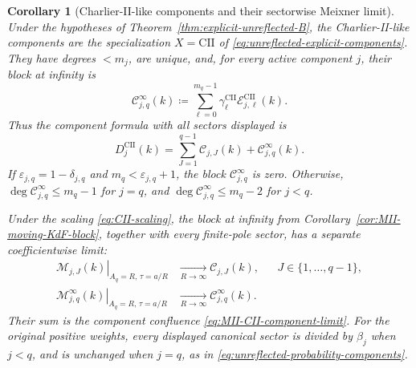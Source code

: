 \documentclass[10pt]{amsart}
\theoremstyle{plain}
\newtheorem{corollary}[theorem]{Corollary}
\theoremstyle{definition}
\theoremstyle{remark}
\begin{document}
\begin{corollary}[Charlier-II-like components and their sectorwise Meixner limit]
\label{cor:CII-sectorwise-MII-limit}
Under the hypotheses of Theorem~\ref{thm:explicit-unreflected-B}, the
Charlier-II-like components are the specialization $X=\mathrm{CII}$ of
\eqref{eq:unreflected-explicit-components}. They have degrees $<m_j$,
are unique, and, for every active component \(j\), their block at infinity is
\begin{equation}
 \mathscr C_{j,q}^{\infty}(k)
 \coloneq
 \sum_{\ell=0}^{m_q-1}\gamma_\ell^{\mathrm{CII}}
 \mathcal E_{j,\ell}^{\mathrm{CII}}(k).
 \label{eq:CII-infinity-block-definition}
\end{equation}
Thus the component formula with all sectors displayed is
\begin{equation}
 D_j^{\mathrm{CII}}(k)
 =\sum_{J=1}^{q-1}\mathscr C_{j,J}(k)
  +\mathscr C_{j,q}^{\infty}(k).
 \label{eq:CII-all-sector-components}
\end{equation}
If \(\varepsilon_{j,q}=1-\delta_{j,q}\) and
\(m_q<\varepsilon_{j,q}+1\), the block
\(\mathscr C_{j,q}^{\infty}\) is zero. Otherwise,
\(\deg\mathscr C_{j,q}^{\infty}\le m_q-1\) for \(j=q\), and
\(\deg\mathscr C_{j,q}^{\infty}\le m_q-2\) for \(j<q\).

Under the scaling \eqref{eq:CII-scaling}, the block at infinity from
Corollary~\ref{cor:MII-moving-KdF-block}, together with every finite-pole
sector, has a separate coefficientwise limit:
\begin{align}
 \left.\mathscr M_{j,J}(k)\right|_{A_q=R,\,\tau=a/R}
 &\xrightarrow[R\to\infty]{}\mathscr C_{j,J}(k),
 &&J\in\{1,\ldots,q-1\},
 \label{eq:MII-CII-finite-sector-limit}\\
 \left.\mathscr M_{j,q}^{\infty}(k)\right|_{A_q=R,\,\tau=a/R}
 &\xrightarrow[R\to\infty]{}\mathscr C_{j,q}^{\infty}(k).
 \label{eq:MII-CII-infinity-sector-limit}
\end{align}
Their sum is the component confluence
\eqref{eq:MII-CII-component-limit}. For the original positive weights,
every displayed canonical sector is divided by \(\beta_j\) when \(j<q\),
and is unchanged when \(j=q\), as in
\eqref{eq:unreflected-probability-components}.
\end{corollary}
\end{document}
